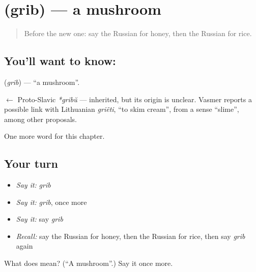 \section[\texorpdfstring{\ru{гриб} (grib)}{гриб (grib)}]{ (grib) — a mushroom}

\label{lesson:RU-C47-mushroom}



\begin{quote}
Before the new one: say the Russian for honey, then the Russian for rice.
\end{quote}

\subsection*{You'll want to know: }
\textbf{} (\emph{grib}) — \textquotedblleft{}a mushroom\textquotedblright{}.

\begin{cousinweb}
\textbf{} $\leftarrow$ Proto-Slavic \emph{*gribŭ} — inherited, but its origin is unclear. Vasmer reports a possible link with Lithuanian \emph{griẽti}, \textquotedblleft{}to skim cream\textquotedblright{}, from a sense \textquotedblleft{}slime\textquotedblright{}, among other proposals.
\end{cousinweb}

\begin{grammarlens}[title={What you've built}]
One more word for this chapter.
\end{grammarlens}

\subsection*{Your turn}
\begin{itemize}
\raggedright
  \item \emph{Say it:} \emph{grib}
  \item \emph{Say it:} \emph{grib}, once more
  \item \emph{Say it:} say \emph{grib}
  \item \emph{Recall:} say the Russian for honey, then the Russian for rice, then say \emph{grib} again
\end{itemize}

\begin{tcolorbox}[breakable,colback=teal!4,colframe=teal!35!black,title={Before you move on}]
What does  mean? (\textquotedblleft{}A mushroom\textquotedblright{}.) Say it once more.
\end{tcolorbox}
